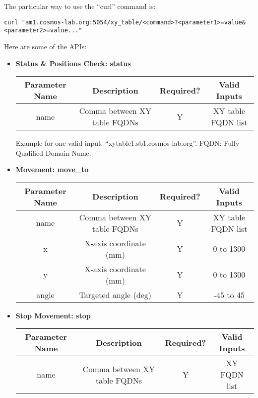 \documentclass{article}
\begin{document}
        The particular way to use the ``curl'' command is: 
        \begin{verbatim}
curl "am1.cosmos-lab.org:5054/xy_table/<command>?<parameter1>=value&<parameter2>=value..."
        \end{verbatim}
        
        Here are some of the APIs:
        \begin{itemize}
            \item \textbf{Status \& Positions Check: status}
            
                \begin{tabular}{|c|c|c|c|}
                    \hline
                    \textbf{Parameter Name} & \textbf{Description} & \textbf{Required?} & \textbf{Valid Inputs}\\
                    \hline\hline
                    name & Comma between XY table FQDNs & Y & XY table FQDN list \\ [1ex]
                    \hline
                \end{tabular}
            
            Example for one valid input: ``xytable1.sb1.cosmos-lab.org''. FQDN: Fully Qualified Domain Name. 
            
            \vspace{1em}
            \item \textbf{Movement: move\_to}
                
                \begin{tabular}{|c|c|c|c|}
                    \hline
                    \textbf{Parameter Name} & \textbf{Description} & \textbf{Required?} & \textbf{Valid Inputs}\\
                    \hline\hline
                    name & Comma between XY table FQDNs & Y & XY table FQDN list \\
                    \hline
                    x & X-axis coordinate (mm) & Y & 0 to 1300 \\
                    \hline
                    y & X-axis coordinate (mm) & Y & 0 to 1300 \\
                    \hline
                    angle & Targeted angle (deg) & Y & -45 to 45 \\ [1ex]
                    \hline
                \end{tabular}
            
            \vspace{1em}
            \item \textbf{Stop Movement: stop}
            
                \begin{tabular}{|c|c|c|c|}
                    \hline
                    \textbf{Parameter Name} & \textbf{Description} & \textbf{Required?} & \textbf{Valid Inputs}\\
                    \hline\hline
                    name & Comma between XY table FQDNs & Y & XY FQDN list \\ [1ex]
                    \hline
                \end{tabular}
        \end{itemize}
            
\end{document}
